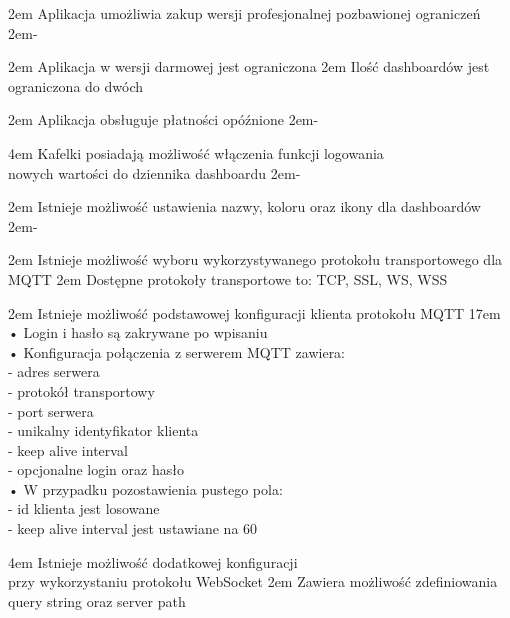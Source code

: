 {2em}{
    Aplikacja umożliwia zakup wersji profesjonalnej pozbawionej ograniczeń
}
{2em}{-}

{2em}{
    Aplikacja w wersji darmowej jest ograniczona
}
{2em}{
    Ilość dashboardów jest ograniczona do dwóch
}

{2em}{
    Aplikacja obsługuje płatności opóźnione
}
{2em}{-}

{4em}{
    Kafelki posiadają możliwość włączenia funkcji logowania\\
    nowych wartości do dziennika dashboardu
}
{2em}{-}

{2em}{
    Istnieje możliwość ustawienia nazwy, koloru oraz ikony dla dashboardów
}
{2em}{-}

{2em}{
    Istnieje możliwość wyboru wykorzystywanego protokołu transportowego dla MQTT
}
{2em}{
    Dostępne protokoły transportowe to: TCP, SSL, WS, WSS
}

{2em}{
    Istnieje możliwość podstawowej konfiguracji klienta protokołu MQTT
}
{17em}{
    • Login i hasło są zakrywane po wpisaniu\\

    • Konfiguracja połączenia z serwerem MQTT zawiera:\\
    - adres serwera\\
    - protokół transportowy\\
    - port serwera\\
    - unikalny identyfikator klienta\\
    - keep alive interval\\
    - opcjonalne login oraz hasło\\

    • W przypadku pozostawienia pustego pola:\\
    - id klienta jest losowane\\
    - keep alive interval jest ustawiane na 60
}

{4em}{
    Istnieje możliwość dodatkowej konfiguracji\\
    przy wykorzystaniu protokołu WebSocket
}
{2em}{
    Zawiera możliwość zdefiniowania query string oraz server path
}


